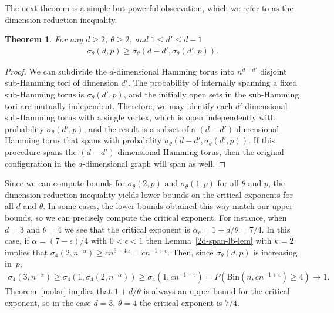 \documentclass{amsart}
\newcommand{\threshold}{\theta}
\numberwithin{equation}{section}
\newtheorem{theorem}{Theorem}[section]
\theoremstyle{definition}
\theoremstyle{remark}
\begin{document}
The next theorem is a simple but powerful observation, which we refer to as the dimension reduction inequality.
\begin{theorem}
\label{dimred-thm}
For any $d\geq 2$, $\threshold \geq 2$, and $1\leq d' \leq d-1$
\begin{align}
\label{dim-reduction}
\sigma_{\threshold}(d,p) \geq \sigma_{\threshold}(d-d',\sigma_{\threshold}(d',p)).
\end{align}
\end{theorem}
\begin{proof}
We can subdivide the $d$-dimensional Hamming torus into $n^{d-d'}$ disjoint sub-Hamming tori of dimension $d'$.  The probability of internally spanning a fixed sub-Hamming torus is $\sigma_{\threshold}(d',p)$, and the initially open sets in the sub-Hamming tori are mutually independent.  Therefore, we may identify each $d'$-dimensional sub-Hamming torus with a single vertex, which is open independently with probability $\sigma_\threshold(d',p)$, and the result is a subset of a $(d-d')$-dimensional Hamming torus that spans with probability $\sigma_\threshold(d-d',\sigma_\threshold(d',p))$.  If this procedure spans the $(d-d')$-dimensional Hamming torus, then the original configuration in the $d$-dimensional graph will span as well.
\end{proof}

Since we can compute bounds for $\sigma_{\threshold}(2,p)$ and $\sigma_{\threshold}(1,p)$ for all $\threshold$ and $p$, the dimension reduction inequality yields lower bounds on the critical exponents for all $d$ and $\threshold$.  In some cases, the lower bounds obtained this way match our upper bounds, so we can precisely compute the critical exponent.  For instance, when $d = 3$ and $\threshold=4$ we see that the critical exponent is $\alpha_c = 1+d/\threshold = 7/4$.  In this case, if $\alpha  = (7-\epsilon)/4$ with $0<\epsilon <1$ then Lemma~\ref{2d-span-lb-lem} with $k=2$ implies that $\sigma_{4}(2,n^{-\alpha}) \geq cn^{6 - 4\alpha} = cn^{-1+\epsilon}$.  Then, since $\sigma_\threshold(d,p)$ is increasing in~$p$,
\begin{align*}
\sigma_4(3,n^{-\alpha}) \geq \sigma_4(1,\sigma_4(2,n^{-\alpha})) \geq \sigma_4(1, c n^{-1+\epsilon})  = P( \text{Bin}(n, cn^{-1+\epsilon}) \geq 4) \to 1.
\end{align*}
Theorem~\ref{molar} implies that $1+d/\threshold$ is always an upper bound for the critical exponent, so in the case $d=3$, $\threshold=4$ the critical exponent is $7/4$.
\end{document}
